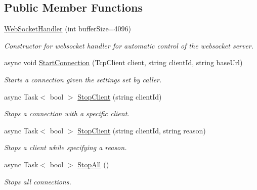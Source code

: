 \subsection*{Public Member Functions}
\begin{DoxyCompactItemize}
\item 
\mbox{\hyperlink{class_simple_web_socket_server_library_1_1_simple_web_socket_handler_1_1_web_socket_handler_a10096ce5b5af80b4e5656e6d1d8ad485}{Web\+Socket\+Handler}} (int buffer\+Size=4096)
\begin{DoxyCompactList}\small\item\em Constructor for websocket handler for automatic control of the websocket server. \end{DoxyCompactList}\item 
async void \mbox{\hyperlink{class_simple_web_socket_server_library_1_1_simple_web_socket_handler_1_1_web_socket_handler_aab85fcebece3958e4308996b57415bd5}{Start\+Connection}} (Tcp\+Client client, string client\+Id, string base\+Url)
\begin{DoxyCompactList}\small\item\em Starts a connection given the settings set by caller. \end{DoxyCompactList}\item 
async Task$<$ bool $>$ \mbox{\hyperlink{class_simple_web_socket_server_library_1_1_simple_web_socket_handler_1_1_web_socket_handler_a9783bb897a6a9708ab861edc102df693}{Stop\+Client}} (string client\+Id)
\begin{DoxyCompactList}\small\item\em Stops a connection with a specific client. \end{DoxyCompactList}\item 
async Task$<$ bool $>$ \mbox{\hyperlink{class_simple_web_socket_server_library_1_1_simple_web_socket_handler_1_1_web_socket_handler_a26ca8d6d9ebbefae58bbdaf3ff7986c4}{Stop\+Client}} (string client\+Id, string reason)
\begin{DoxyCompactList}\small\item\em Stops a client while specifying a reason. \end{DoxyCompactList}\item 
async Task$<$ bool $>$ \mbox{\hyperlink{class_simple_web_socket_server_library_1_1_simple_web_socket_handler_1_1_web_socket_handler_acd6bdfe5797bdacb39730f83bafde6fc}{Stop\+All}} ()
\begin{DoxyCompactList}\small\item\em Stops all connections. \end{DoxyCompactList}\item 

\end{DoxyCompactItemize}
